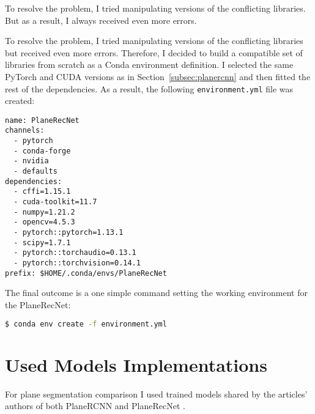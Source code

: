 To resolve the problem, I tried manipulating versions of the conflicting libraries.
But as a result, I always received even more errors.

To resolve the problem, I tried manipulating versions of the conflicting libraries but received even more errors.
Therefore, I decided to build a compatible set of libraries from scratch as a Conda environment definition.
I selected the same PyTorch and CUDA versions as in Section~\ref{subsec:planercnn}
and then fitted the rest of the dependencies.
As a result, the following \texttt{environment.yml} file was created:
\begin{lstlisting}[style=yaml]
name: PlaneRecNet
channels:
  - pytorch
  - conda-forge
  - nvidia
  - defaults
dependencies:
  - cffi=1.15.1
  - cuda-toolkit=11.7
  - numpy=1.21.2
  - opencv=4.5.3
  - pytorch::pytorch=1.13.1
  - scipy=1.7.1
  - pytorch::torchaudio=0.13.1
  - pytorch::torchvision=0.14.1
prefix: $HOME/.conda/envs/PlaneRecNet  
\end{lstlisting}

The final outcome is a one simple command setting the working environment for the PlaneRecNet:
\begin{lstlisting}[language=bash]
$ conda env create -f environment.yml
\end{lstlisting}

\section{Used Models Implementations}

For plane segmentation comparison I used trained models shared by the articles' authors
of both PlaneRCNN \cite{planercnn-repository} and PlaneRecNet \cite{planerecnet-repository}. 
